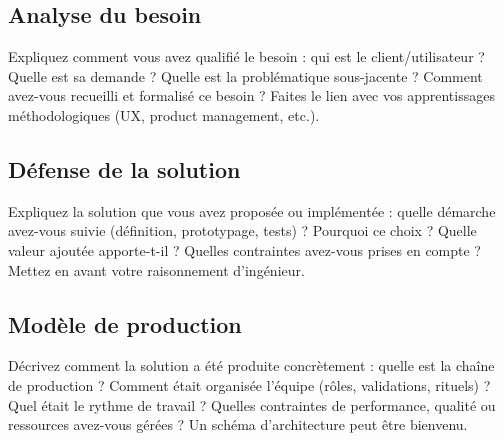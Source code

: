 \subsection{Analyse du besoin}

\begin{guideline}
Expliquez comment vous avez qualifié le besoin : qui est le client/utilisateur ? Quelle est sa demande ? Quelle est la problématique sous-jacente ? Comment avez-vous recueilli et formalisé ce besoin ? Faites le lien avec vos apprentissages méthodologiques (UX, product management, etc.).
\end{guideline}



\subsection{Défense de la solution}

\begin{guideline}
Expliquez la solution que vous avez proposée ou implémentée : quelle démarche avez-vous suivie (définition, prototypage, tests) ? Pourquoi ce choix ? Quelle valeur ajoutée apporte-t-il ? Quelles contraintes avez-vous prises en compte ? Mettez en avant votre raisonnement d'ingénieur.
\end{guideline}



\subsection{Modèle de production}

\begin{guideline}
Décrivez comment la solution a été produite concrètement : quelle est la chaîne de production ? Comment était organisée l'équipe (rôles, validations, rituels) ? Quel était le rythme de travail ? Quelles contraintes de performance, qualité ou ressources avez-vous gérées ? Un schéma d'architecture peut être bienvenu.
\end{guideline}

